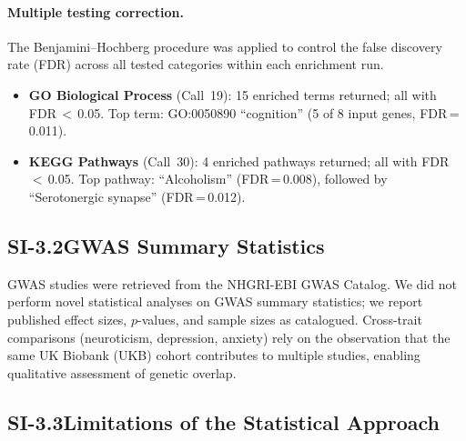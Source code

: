 \paragraph{Multiple testing correction.}
The Benjamini--Hochberg procedure was applied to control the false discovery
rate (FDR) across all tested categories within each enrichment run.

\begin{itemize}[nosep]
  \item \textbf{GO Biological Process} (Call~19): 15 enriched terms returned;
        all with FDR\,$<$\,0.05.  Top term: GO:0050890 ``cognition'' (5 of
        8 input genes, FDR\,=\,0.011).
  \item \textbf{KEGG Pathways} (Call~30): 4 enriched pathways returned; all
        with FDR\,$<$\,0.05.  Top pathway: ``Alcoholism'' (FDR\,=\,0.008),
        followed by ``Serotonergic synapse'' (FDR\,=\,0.012).
\end{itemize}

\subsection*{SI-3.2\quad GWAS Summary Statistics}

GWAS studies were retrieved from the NHGRI-EBI GWAS Catalog.  We did not
perform novel statistical analyses on GWAS summary statistics; we report
published effect sizes, $p$-values, and sample sizes as catalogued.  Cross-trait
comparisons (neuroticism, depression, anxiety) rely on the observation that the
same UK Biobank (UKB) cohort contributes to multiple studies, enabling
qualitative assessment of genetic overlap.

\subsection*{SI-3.3\quad Limitations of the Statistical Approach}

